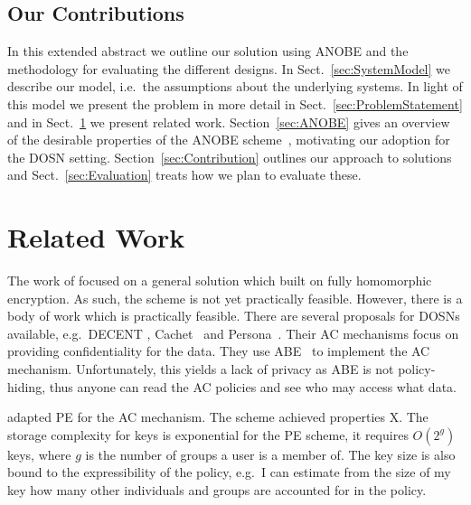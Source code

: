 \subsection{Our Contributions}

In this extended abstract we outline our solution using \ac{ANOBE} and the 
methodology for evaluating the different designs.
In Sect.~\ref{sec:SystemModel} we describe our model, i.e.~the assumptions 
about the underlying systems.
In light of this model we present the problem in more detail in 
Sect.~\ref{sec:ProblemStatement} and in Sect.~\ref{sec:RelatedWork} we present 
related work.
Section~\ref{sec:ANOBE} gives an overview of the desirable properties of the 
\ac{ANOBE} scheme~\cite{anobe}, motivating our adoption for the \ac{DOSN} 
setting.
Section~\ref{sec:Contribution} outlines our approach to solutions and 
Sect.~\ref{sec:Evaluation} treats how we plan to evaluate these.


\section{Related Work}\label{sec:RelatedWork}

The work of \citet{TowardsPPACwHPHCHD} focused on a general solution which 
built on fully homomorphic encryption.
As such, the scheme is not yet practically feasible.
However, there is a body of work which is practically feasible.
There are several proposals for \acp{DOSN} available, e.g.~DECENT
\cite{decent}, Cachet~\cite{cachet} and Persona~\cite{persona}.
Their \ac{AC} mechanisms focus on providing confidentiality for the 
data.
They use \ac{ABE}~\cite{abe} to implement the \ac{AC} mechanism.
Unfortunately, this yields a lack of privacy as \ac{ABE} is not policy-hiding, 
thus anyone can read the \ac{AC} policies and see who may access what 
data.

\citet{predicateac} adapted \ac{PE} for the \ac{AC} mechanism.
The scheme achieved properties X.
The storage complexity for keys is exponential for the \ac{PE} scheme, it 
requires \(O(2^g)\) keys, where \(g\) is the number of groups a user is 
a member of.
The key size is also bound to the expressibility of the policy, e.g.\ I can 
estimate from the size of my key how many other individuals and groups are 
accounted for in the policy.

